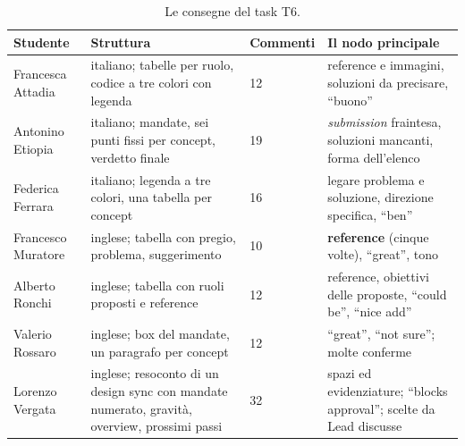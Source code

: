 \begin{table}[htbp]
  \centering
  \caption{Le consegne del task T6.}
  \label{rv:t6:tab:consegne}
  \small
  \begin{tabular}{@{}p{2.4cm}p{3.5cm}p{1.7cm}p{4.3cm}@{}}
    \toprule
    \textbf{Studente} & \textbf{Struttura} & \textbf{Commenti} &
    \textbf{Il nodo principale} \\
    \midrule
    Francesca Attadia & italiano; tabelle per ruolo, codice a tre colori
      con legenda & 12 & reference e immagini, soluzioni da precisare,
      ``buono'' \\
    \addlinespace
    Antonino Etiopia & italiano; mandate, sei punti fissi per concept,
      verdetto finale & 19 & \emph{submission} fraintesa, soluzioni mancanti,
      forma dell'elenco \\
    \addlinespace
    Federica Ferrara & italiano; legenda a tre colori, una tabella per
      concept & 16 & legare problema e soluzione, direzione specifica,
      ``ben'' \\
    \addlinespace
    Francesco Muratore & inglese; tabella con pregio, problema,
      suggerimento & 10 & \textbf{reference} (cinque volte), ``great'', tono \\
    \addlinespace
    Alberto Ronchi & inglese; tabella con ruoli proposti e reference & 12 &
      reference, obiettivi delle proposte, ``could be'', ``nice add'' \\
    \addlinespace
    Valerio Rossaro & inglese; box del mandate, un paragrafo per concept &
      12 & ``great'', ``not sure''; molte conferme \\
    \addlinespace
    Lorenzo Vergata & inglese; resoconto di un design sync con mandate
      numerato, gravità, overview, prossimi passi & 32 & spazi ed
      evidenziature; ``blocks approval''; scelte da Lead discusse \\
    \bottomrule
  \end{tabular}
\end{table}

